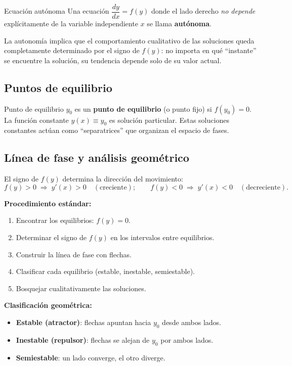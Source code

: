 \documentclass[11pt,letterpaper]{article}
\begin{document}
\begin{definicion}{Ecuación autónoma}{}
Una ecuación $\dfrac{dy}{dx}=f(y)$ donde el lado derecho \emph{no depende}
explícitamente de la variable independiente $x$ se llama \textbf{autónoma}.
\end{definicion}

La autonomía implica que el comportamiento cualitativo de las soluciones queda
completamente determinado por el signo de $f(y)$: no importa en qué ``instante''
se encuentre la solución, su tendencia depende solo de su valor actual.

\subsection{Puntos de equilibrio}

\begin{definicion}{Punto de equilibrio}{}
$y_0$ es un \textbf{punto de equilibrio} (o punto fijo) si $f(y_0)=0$.
La función constante $y(x)\equiv y_0$ es solución particular. Estas soluciones
constantes actúan como ``separatrices'' que organizan el espacio de fases.
\end{definicion}

\subsection{Línea de fase y análisis geométrico}

El signo de $f(y)$ determina la dirección del movimiento:
\[
f(y)>0\;\Rightarrow\; y'(x)>0\quad(\text{creciente});\qquad
f(y)<0\;\Rightarrow\; y'(x)<0\quad(\text{decreciente}).
\]

\textbf{Procedimiento estándar:}
\begin{enumerate}
    \item Encontrar los equilibrios: $f(y)=0$.
    \item Determinar el signo de $f(y)$ en los intervalos entre equilibrios.
    \item Construir la línea de fase con flechas.
    \item Clasificar cada equilibrio (estable, inestable, semiestable).
    \item Bosquejar cualitativamente las soluciones.
\end{enumerate}

\textbf{Clasificación geométrica:}
\begin{itemize}
    \item \textbf{Estable (atractor)}: flechas apuntan hacia $y_0$ desde ambos lados.
    \item \textbf{Inestable (repulsor)}: flechas se alejan de $y_0$ por ambos lados.
    \item \textbf{Semiestable}: un lado converge, el otro diverge.
\end{itemize}
\end{document}
